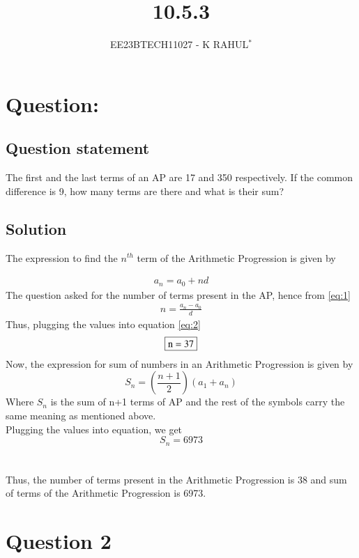 \documentclass[journal,12pt,twocolumn]{IEEEtran}
\theoremstyle{remark}
\begin{document}

\vspace{3cm}
\title{10.5.3}
\author{EE23BTECH11027 - K RAHUL$^{*}$%
}
\maketitle
\newpage
\bigskip
\renewcommand{\thefigure}{\theenumi}
\renewcommand{\thetable}{\theenumi}
\section{Question:}
\subsection{Question statement}
The first and the last terms of an AP are 17 and 350 respectively. If the common difference
is 9, how many terms are there and what is their sum?
\subsection{Solution}
The expression to find the $n^{th}$ term of the Arithmetic Progression is given by
\begin{table}[h]

\end{table}
\bigskip
\begin{align}\label{eq:1}a_n = a_0 + nd\end{align}
The question asked for the number of terms present in the AP, hence from \ref{eq:1}
\begin{align}\label{eq:2} n=\frac{a_n-a_0}{d} \end{align}
Thus, plugging the values into equation \ref{eq:2} 
$$\fbox{n = 37}$$
Now, the expression for sum of numbers in an Arithmetic Progression is given by
\begin{equation}\label{eq:3} S_n = (\frac{n+1}{2})(a_1+a_n)\end{equation}
Where $S_n$ is the sum of n+1 terms of AP and the rest of the symbols carry the same meaning as mentioned above.\\
Plugging the values into equation, we get
$$S_n = 6973$$\\\\
Thus, the number of terms present in the Arithmetic Progression is 38 and sum of terms of the Arithmetic Progression is 6973.
\section{Question 2}
\end{document}
